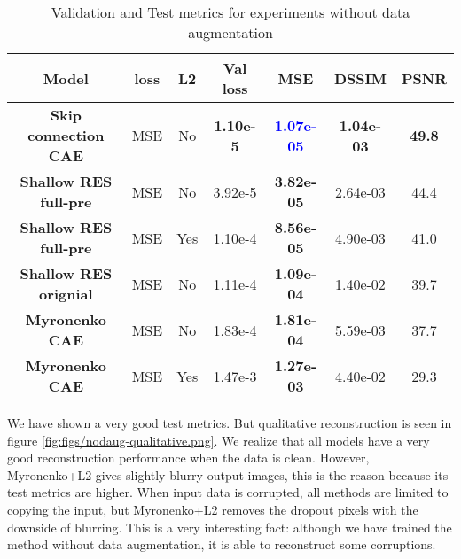 \begin{table}[!ht]
  \begin{center}
   \setlength\extrarowheight{2pt} %
   \begin{tabular}{c c c | c | >{\bf}c c c}
    \toprule
    \textbf{Model} & \textbf{loss}  & \textbf{L2}  & \textbf{Val loss}  & \textbf{MSE}               & \textbf{DSSIM} & \textbf{PSNR} \\
    \hline   
    \textbf{Skip connection CAE}   & MSE & No  & \textbf{1.10e-5}   & \textcolor{blue}{1.07e-05} &\textbf{ 1.04e-03} &		\textbf{49.8} \\
    \textbf{Shallow RES full-pre}  & MSE & No  & 3.92e-5            & 3.82e-05                   & 2.64e-03	&	44.4\\
    \textbf{Shallow RES full-pre}  & MSE & Yes & 1.10e-4            & 8.56e-05                   & 4.90e-03	&	41.0 \\
    \textbf{Shallow RES orignial}  & MSE & No  & 1.11e-4            & 1.09e-04                   & 1.40e-02	&	39.7 \\
    \textbf{Myronenko CAE}         & MSE & No  & 1.83e-4            & 1.81e-04                   & 5.59e-03	&	37.7 \\
    \textbf{Myronenko CAE}         & MSE & Yes  & 1.47e-3            & 1.27e-03                   & 4.40e-02	&	29.3 \\
    \bottomrule
    \end{tabular}
    \end{center}
    \caption{Validation and Test metrics for experiments without data augmentation}
    \label{table:expnodaug}
\end{table}


We have shown a very good test metrics. But qualitative reconstruction is seen in figure \ref{fig:figs/nodaug-qualitative.png}. We realize that all models have a very good reconstruction performance when the data is clean. However, Myronenko+L2 gives slightly blurry output images, this is the reason because its test metrics are higher. When input data is corrupted, all methods are limited to copying the input, but Myronenko+L2 removes the dropout pixels with the downside of blurring. This is a very interesting fact: although we have trained the method without data augmentation, it is able to reconstruct some corruptions.

